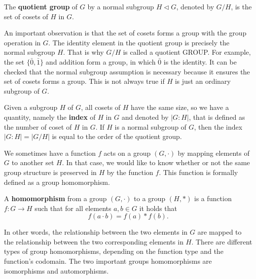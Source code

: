 \documentclass[../main.tex]{subfiles}
\begin{document}
\begin{definition}
\reversemarginpar
{}
The \textbf{quotient group} of $G$ by a normal subgroup $H \triangleleft G$, denoted by $G/H$, is the set of cosets of $H$ in $G$.
\end{definition}

An important observation is that the set of cosets forms a group with the group operation in $G$. The identity element in the quotient group is precisely the normal subgroup $H$. That is why $G/H$ is called a quotient GROUP. For example, the set $\{\bar{0}, \bar{1}\}$ and addition form a group, in which $\bar{0}$ is the identity. It can be checked that the normal subgroup assumption is necessary because it ensures the set of cosets forms a group. This is not always true if $H$ is just an ordinary subgroup of $G$. %

Given a subgroup $H$ of $G$, all cosets of $H$ have the same size, so we have a quantity, namely
\reversemarginpar
{}
the \textbf{index} of $H$ in $G$ and denoted by $|G:H|$, that is defined as the number of
coset of $H$ in $G$. If $H$ is a normal subgroup of $G$, then the index $|G:H|=|G/H|$ is equal to the order of the quotient group. 

We sometimes have a function $f$ acts on a group $(G,\cdot)$ by mapping elements of $G$ to another set $H$. In that case, we would like to know whether or not the same group structure is preserved in $H$ by the function $f$. This function is formally defined as a group homomorphism.

\begin{definition}
A \textbf{homomorphism} \reversemarginpar
{}
from a group $(G,\cdot)$ to a group $(H,*)$ is a function $f:G \rightarrow H$ such that for all elements $a, b \in G$ it holds that 
\begin{equation*}
    f(a \cdot b) = f(a) * f(b).
\end{equation*}
\end{definition}

In other words, the relationship between the two elements in $G$ are mapped to the relationship between the two corresponding elements in $H$. There are different types of group homomorphisms, depending on the function type and the function's codomain. The two important groups homomorphisms are isomorphisms and automorphisms. 
\end{document}
